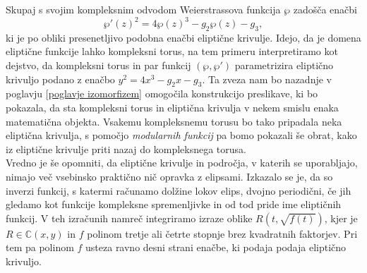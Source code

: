 \documentclass[mat1]{fmfdelo}
\numberwithin{equation}{section}
\newcommand{\C}{\mathbb C}
\theoremstyle{definition}
\begin{document}
Skupaj s svojim kompleksnim odvodom Weierstrassova funkcija $\wp$ zadošča enačbi
\[
  \wp'(z)^2 = 4\wp(z)^3 - g_2\wp(z) - g_3,  
\] 
ki je po obliki presenetljivo podobna enačbi eliptične krivulje. Idejo, da je domena eliptične funkcije lahko kompleksni torus, na tem primeru interpretiramo kot dejstvo, da kompleksni torus in par funkcij $(\wp, \wp')$ parametrizira eliptično krivuljo podano z enačbo $y^2 = 4x^3 - g_2x - g_3$.
Ta zveza nam bo nazadnje v poglavju \ref{poglavje izomorfizem} omogočila konstrukcijo preslikave, ki bo pokazala, da sta kompleksni torus in eliptična krivulja v nekem smislu enaka matematična objekta. Vsakemu kompleksnemu torusu bo tako pripadala neka eliptična krivulja, s pomočjo \emph{modularnih funkcij} pa bomo pokazali še obrat, kako iz eliptične krivulje priti nazaj do kompleksnega torusa. 
\\

Vredno je še opomniti, da eliptične krivulje in področja, v katerih se uporabljajo,
nimajo več vsebinsko praktično nič opravka z elipsami. 
Izkazalo se je, da so inverzi funkcij, s katermi računamo dolžine lokov elips, dvojno periodični,
če jih gledamo kot funkcije kompleksne spremenljivke in od tod pride ime eliptičnih funkcij. V teh izračunih namreč integriramo izraze oblike $R(t, \sqrt{f(t)})$, kjer je $R \in \C(x,y)$ in $f$ polinom tretje ali četrte stopnje brez kvadratnih faktorjev. Pri tem pa polinom $f$ usteza ravno desni strani enačbe, ki podaja podaja eliptično krivuljo. 

\end{document}
